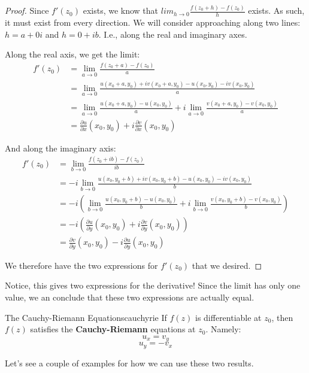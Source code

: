 \begin{proof} Since $f'(z_0)$ exists, we know that $lim_{h\rightarrow 0} \frac{f(z_0 + h) - f(z_0)}{h}$ exists. As such, it must exist from every direction. We will consider approaching along two lines: $h = a + 0i$ and $h = 0 + ib$. I.e., along the real and imaginary axes.

Along the real axis, we get the limit:
\begin{align*}f'(z_0) &= \lim_{a\rightarrow 0} \frac{f(z_0 + a) - f(z_0)}{a}\\
&= \lim_{a\rightarrow 0} \frac{u(x_0+a,y_0) + iv(x_0 + a, y_0) - u(x_0,y_0) - iv(x_0,y_0)}{a}\\
&=\lim_{a\rightarrow 0} \frac{u(x_0+a,y_0) - u(x_0,y_0)}{a} + i\lim_{a\rightarrow 0} \frac{v(x_0 + a, y_0) -v(x_0,y_0)}{a}\\
&= \frac{\partial u}{\partial x}(x_0,y_0) + i\frac{\partial v}{\partial x}(x_0,y_0)
\end{align*}

And along the imaginary axis: 
\begin{align*}f'(z_0) &= \lim_{b\rightarrow 0} \frac{f(z_0 + ib) - f(z_0)}{ib}\\
&= -i\lim_{b\rightarrow 0} \frac{u(x_0,y_0+b) + iv(x_0, y_0+b) - u(x_0,y_0) - iv(x_0,y_0)}{b}\\
&=-i\left(\lim_{b\rightarrow 0} \frac{u(x_0,y_0+b) - u(x_0,y_0)}{b} + i\lim_{b\rightarrow 0} \frac{v(x_0, y_0+b) -v(x_0,y_0)}{b}\right)\\
&= -i\left(\frac{\partial u}{\partial y}(x_0,y_0) + i\frac{\partial v}{\partial y}(x_0,y_0)\right)\\
&=\frac{\partial v}{\partial y}(x_0,y_0) - i\frac{\partial u}{\partial y}(x_0,y_0)
\end{align*}

We therefore have the two expressions for $f'(z_0)$ that we desired.
\end{proof}

Notice, this gives two expressions for the derivative! Since the limit has only one value, we an conclude that these two expressions are actually equal.

\begin{corbo}{The Cauchy-Riemann Equations}{cauchyrie}
If $f(z)$ is differentiable at $z_0$, then $f(z)$ satisfies the {\bf Cauchy-Riemann} equations at $z_0$. Namely:
$$u_x = v_y$$
$$u_y = -v_x$$
\end{corbo}

Let's see a couple of examples for how we can use these two results.

